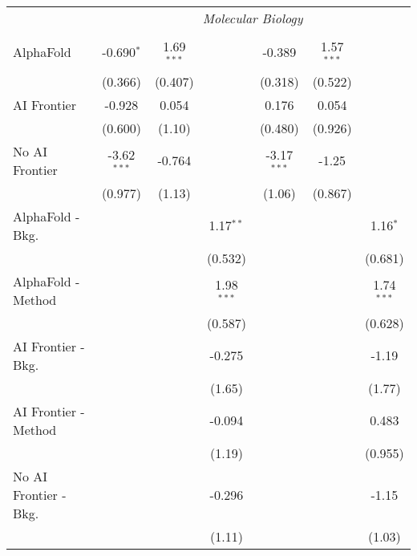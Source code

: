 \begin{tabular}{lcccccc}
 & \multicolumn{6}{c}{\textit{Molecular Biology}} \\ \\
   AlphaFold               & -0.690$^{*}$  & 1.69$^{***}$ &              & -0.389        & 1.57$^{***}$ &   \\   
                           & (0.366)       & (0.407)      &              & (0.318)       & (0.522)      &   \\   
   AI Frontier             & -0.928        & 0.054        &              & 0.176         & 0.054        &   \\   
                           & (0.600)       & (1.10)       &              & (0.480)       & (0.926)      &   \\   
   No AI Frontier          & -3.62$^{***}$ & -0.764       &              & -3.17$^{***}$ & -1.25        &   \\   
                           & (0.977)       & (1.13)       &              & (1.06)        & (0.867)      &   \\   
   AlphaFold - Bkg.        &               &              & 1.17$^{**}$  &               &              & 1.16$^{*}$\\   
                           &               &              & (0.532)      &               &              & (0.681)\\   
   AlphaFold - Method      &               &              & 1.98$^{***}$ &               &              & 1.74$^{***}$\\   
                           &               &              & (0.587)      &               &              & (0.628)\\   
   AI Frontier - Bkg.      &               &              & -0.275       &               &              & -1.19\\   
                           &               &              & (1.65)       &               &              & (1.77)\\   
   AI Frontier - Method    &               &              & -0.094       &               &              & 0.483\\   
                           &               &              & (1.19)       &               &              & (0.955)\\   
   No AI Frontier - Bkg.   &               &              & -0.296       &               &              & -1.15\\   
                           &               &              & (1.11)       &               &              & (1.03)\\   

\end{tabular}

